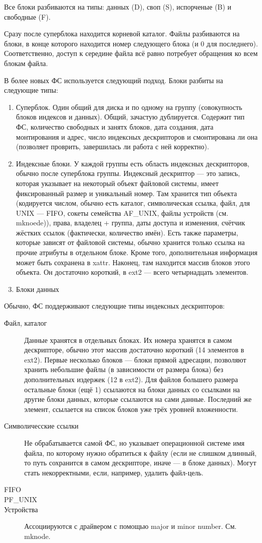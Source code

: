 \documentclass[main]{subfiles}
\begin{document}
Все блоки разбиваются на типы: данных (D), своп (S), испорченые (B)
и свободные (F).

Сразу после суперблока находится корневой каталог.
Файлы разбиваются на блоки, в конце которого находится номер следующего
блока (и 0 для последнего). Соответственно, доступ к середине файла
всё равно потребует обращения ко всем блокам файла.

В более новых ФС используется следующий подход. Блоки разбиты на следующие
типы:
\begin{enumerate}
\item Суперблок. Один общий для диска и по одному на группу (совокупность
блоков индексов и данных). Общий, зачастую дублируется.
Содержит тип ФС, количество свободных и занятх блоков, дата создания,
дата монтирования и адрес, число индексных дескрипторов и смонтирована
ли она (позволяет проврить, завершилась ли работа с ней корректно).
\item Индексные блоки. У каждой группы есть область индексных дескрипторов,
обычно после суперблока группы. Индексный дескриптор --- это запись, которая
указывает на некоторый объект файловой системы, имеет фиксированный размер
и уникальный номер. Там хранится тип объекта (кодируется числом, обычно есть
каталог, символическая ссылка, файл, для UNIX --- FIFO, сокеты семейства
AF\_UNIX, файлы устройств (см. mknoede)), права, владелец + группа,
даты доступа и изменения, счётчик жёстких ссылок (фактически, количество имён).
Есть также параметры, которые зависят от файловой системы, обычно хранится
только ссылка на прочие атрибуты в отдельном блоке. Кроме того,
дополнительная информация может быть сохранена в xattr.
Наконец, там находится массив блоков этого объекта. Он достаточно короткий,
в ext2 --- всего четырнадцать элементов.
\item Блоки данных
\end{enumerate}

Обычно, ФС поддерживают следующие типы индексных дескрипторов:
\begin{description}
\item[Файл, каталог] Данные хранятся в отдельных блоках. Их номера хранятся в
самом дескрипторе, обычно этот массив достаточно короткий (14 элементов в ext2).
Первые несколько блоков --- блоки прямой адресации, позволяют хранить
небольшие файлы (в зависимости от размера блока) без дополнительных издержек
(12 в ext2).
Для файлов большего размера остальные блоки (ещё 1) ссылаются на блоки данных со
ссылками на другие блоки данных, которые ссылаются на сами данные.
Последний же элемент, ссылается на список блоков уже трёх уровней вложенности.
\item[Символичесские ссылки] Не обрабатывается самой ФС, но указывает операционной
системе имя файла, по которому нужно обратиться к файлу (если не слишком длинный,
то путь сохранится в самом дескрипторе, иначе --- в блоке данных). Могут стать
некорректными, если, например, удалить файл-цель.
\item[FIFO]
\item[PF\_UNIX]
\item[Устройства] Ассоциируются с драйвером с помощью major и minor number.
См. mknode.
\end{description}
\end{document}
